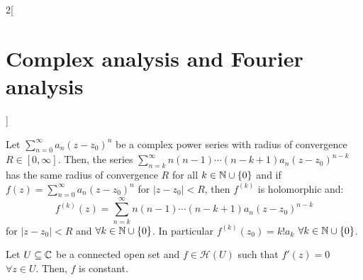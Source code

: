 \documentclass[../../../main.tex]{subfiles}
\begin{document}
\begin{multicols}{2}[\section{Complex analysis and Fourier analysis}]
\begin{theorem}
  \end{theorem}
  \begin{corollary}
    Let $\sum_{n=0}^\infty a_n{(z-z_0)}^n$ be a complex power series with radius of convergence $R\in[0,\infty]$. Then, the series $\sum_{n=k}^\infty n(n-1)\cdots(n-k+1)a_n{(z-z_0)}^{n-k}$ has the same radius of convergence $R$ for all $k\in\mathbb{N} \cup\{0\}$ and if $f(z)=\sum_{n=0}^\infty a_n{(z-z_0)}^n$ for $|z-z_0|<R$, then $f^{(k)}$ is holomorphic and: $$f^{(k)}(z)=\sum_{n=k}^\infty n(n-1)\cdots(n-k+1)a_n{(z-z_0)}^{n-k}$$ for $|z-z_0|<R$ and $\forall k\in\mathbb{N} \cup\{0\}$. In particular $f^{(k)}(z_0)=k!a_k$ $\forall k\in\mathbb{N}\cup\{0\}$.
  \end{corollary}
  \begin{proposition}
    Let $U\subseteq\mathbb{C}$ be a connected open set and $f\in\mathcal{H}(U)$ such that $f'(z)=0$ $\forall z\in U$. Then, $f$ is constant.
  \end{proposition}

\end{multicols}
\end{document}
